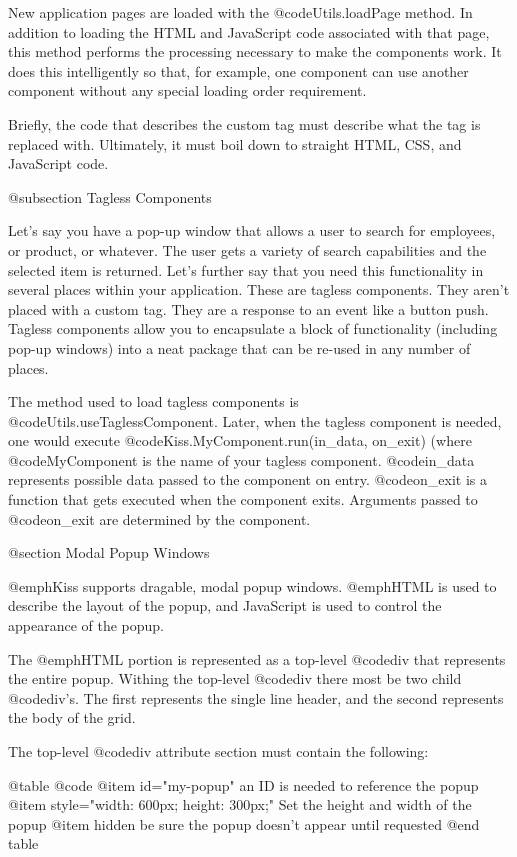 New application pages are loaded with the @code{Utils.loadPage}
method.  In addition to loading the HTML and JavaScript code
associated with that page, this method performs the processing
necessary to make the components work.  It does this intelligently so
that, for example, one component can use another component without any
special loading order requirement.

Briefly, the code that describes the custom tag must describe what the
tag is replaced with.  Ultimately, it must boil down to straight HTML,
CSS, and JavaScript code.


@subsection Tagless Components

Let's say you have a pop-up window that allows a user to search for employees, or product, or whatever.
The user gets a variety of search capabilities and the selected item is returned. Let's further say
that you need this functionality in several places within your application.  These are tagless
components.  They aren't placed with a custom tag.  They are a response to an event like a button push.
Tagless components allow you to encapsulate a block of functionality (including pop-up windows) into
a neat package that can be re-used in any number of places.

The method used to load tagless components is
@code{Utils.useTaglessComponent}.  Later, when the tagless component
is needed, one would execute @code{Kiss.MyComponent.run(in_data, on_exit)} (where
@code{MyComponent} is the name of your tagless component.  
@code{in_data} represents possible data passed to the component on entry.
@code{on_exit} is a function that gets executed when the component exits.
Arguments passed to @code{on_exit} are determined by the component.


@section Modal Popup Windows

@emph{Kiss} supports dragable, modal popup windows. @emph{HTML} is used to describe the layout of the popup, and JavaScript is used
to control the appearance of the popup.

The @emph{HTML} portion is represented as a top-level @code{div} that represents the entire popup.  Withing the top-level
@code{div} there most be two child @code{div}'s.  The first represents the single line header, and the second represents
the body of the grid.

The top-level @code{div} attribute section must contain the following:

@table @code
@item id="my-popup"
an ID is needed to reference the popup
@item style="width: 600px; height: 300px;"
Set the height and width of the popup
@item hidden
be sure the popup doesn't appear until requested
@end table

